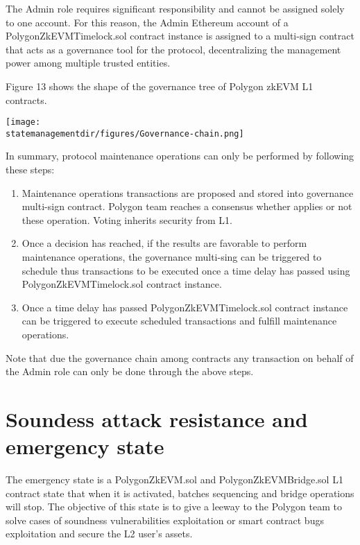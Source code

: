 The Admin role requires significant responsibility and cannot be assigned solely to one account. For this reason, the Admin Ethereum account of a PolygonZkEVMTimelock.sol contract instance is assigned to a multi-sign contract that acts as a governance tool for the protocol, decentralizing the management power among multiple trusted entities.

Figure 13 shows the shape of the governance tree of Polygon zkEVM L1 contracts.

\begin{center}
	\texttt{[image: \\statemanagementdir/figures/Governance-chain.png]}
	
\end{center}

In summary, protocol maintenance operations can only be performed by following these steps:

\begin{enumerate}
	\item Maintenance operations transactions are proposed and stored into governance multi-sign contract. Polygon team reaches a consensus whether applies or not these operation. Voting inherits security from L1.
	
	\item Once a decision has reached, if the results are favorable to perform maintenance operations, the governance multi-sing can be triggered to schedule thus transactions to be executed once a time delay has passed using PolygonZkEVMTimelock.sol contract instance.
	
	\item Once a time delay has passed PolygonZkEVMTimelock.sol contract instance can be triggered to execute scheduled transactions and fulfill maintenance operations.
\end{enumerate}



Note that due the governance chain among contracts any transaction on behalf of the Admin role can only be done through the above steps.
     
\section{Soundess attack resistance and emergency state}

The emergency state is a PolygonZkEVM.sol and PolygonZkEVMBridge.sol L1 contract state that when it is activated, batches sequencing and bridge operations will stop. The objective of this state is to give a leeway to the Polygon team to solve cases of soundness vulnerabilities exploitation or smart contract bugs exploitation and secure the L2 user's assets.

